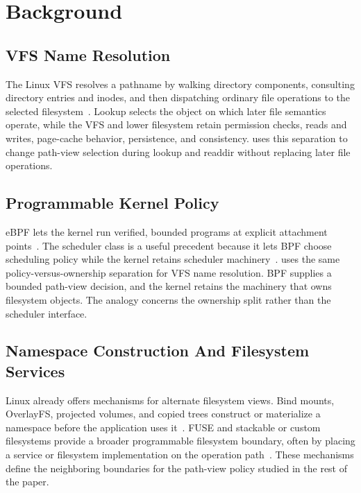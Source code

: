 \section{Background}
\label{sec:background}

\subsection{VFS Name Resolution}

The Linux VFS resolves a pathname by walking directory components, consulting
directory entries and inodes, and then dispatching ordinary file operations to
the selected filesystem~\cite{linux_vfs_docs,linux_path_lookup}. Lookup selects
the object on which later file semantics operate, while the VFS and lower
filesystem retain permission checks, reads and writes, page-cache behavior,
persistence, and consistency. \namei uses this separation to change path-view
selection during lookup and readdir without replacing later file operations.

\subsection{Programmable Kernel Policy}

eBPF lets the kernel run verified, bounded programs at explicit attachment
points~\cite{linux_bpf_docs,linux_bpf_verifier}. The  scheduler class is a useful precedent because it
lets BPF choose scheduling policy while the kernel retains scheduler
machinery~\cite{linux_sched_ext}. \namei uses the same policy-versus-ownership
separation for VFS name resolution. BPF supplies a bounded path-view decision,
and the kernel retains the machinery that owns filesystem objects. The analogy
concerns the ownership split rather than the scheduler interface.

\subsection{Namespace Construction And Filesystem Services}

Linux already offers mechanisms for alternate filesystem views. Bind mounts,
OverlayFS, projected volumes, and copied trees construct or materialize a
namespace before the application uses it~\cite{linux_mount,linux_overlayfs,kubernetes_projected_volumes}.
FUSE and stackable or custom filesystems provide a broader programmable
filesystem boundary, often by placing a service or filesystem implementation on
the operation path~\cite{linux_fuse,wrapfs,bento}. These mechanisms define the neighboring
boundaries for the path-view policy studied in the rest of the paper.

